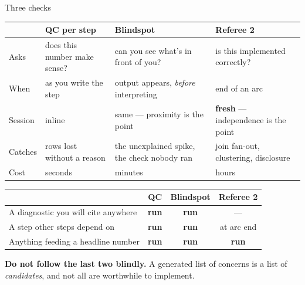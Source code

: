 \documentclass[notes,11pt, aspectratio=169, xcolor={table}]{beamer}
\begin{document}
\begin{frame}{Three checks}

\vspace{-0.2em}
\scriptsize
\begin{center}
\begin{tabular}{L{0.09\textwidth} L{0.22\textwidth} L{0.26\textwidth} L{0.28\textwidth}}
\toprule
 & \textbf{QC per step} & \textbf{Blindspot} & \textbf{Referee 2} \\
\midrule
Asks & does this number make sense? & can you see what's in front of you? & is this implemented correctly? \\[3pt]
When & as you write the step & output appears, \emph{before} interpreting & end of an arc \\[3pt]
Session & inline & same --- proximity is the point & \textbf{fresh} --- independence is the point \\[3pt]
Catches & rows lost without a reason & the unexplained spike, the check nobody ran & join fan-out, clustering, disclosure \\[3pt]
Cost & seconds & minutes & hours \\
\bottomrule
\end{tabular}
\end{center}

\vspace{0.6em}
\begin{center}
\begin{tabular}{L{0.42\textwidth} c c c}
\toprule
 & \textbf{QC} & \textbf{Blindspot} & \textbf{Referee 2} \\
\midrule
A diagnostic you will cite anywhere & \textbf{run} & \textbf{run} & --- \\
A step other steps depend on & \textbf{run} & \textbf{run} & at arc end \\
Anything feeding a headline number & \textbf{run} & \textbf{run} & \textbf{run} \\
\bottomrule
\end{tabular}
\end{center}

\vspace{0.7em}
\small
\begin{center}
\begin{minipage}{0.92\textwidth}
{\color{red}\textbf{Do not follow the last two blindly.}} A generated list of concerns is a list
of \emph{candidates}, and not all are worthwhile to implement. 
\end{minipage}
\end{center}
\end{frame}
\end{document}
